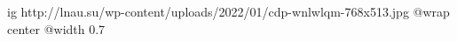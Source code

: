  
 
 
 
 

\ifcmt
  ig http://lnau.su/wp-content/uploads/2022/01/cdp-wnlwlqm-768x513.jpg
	@wrap center
	@width 0.7
\fi
